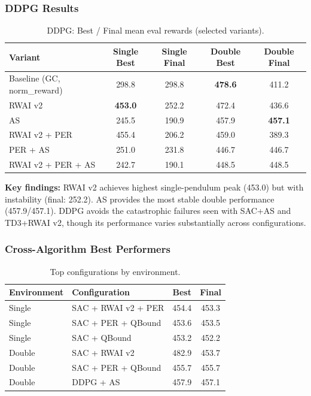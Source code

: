 \documentclass[11pt,a4paper]{article}
\begin{document}
\subsubsection{DDPG Results}

\begin{table}[h]
\centering
\caption{DDPG: Best / Final mean eval rewards (selected variants).}
\small
\begin{tabular}{lcccc}
\toprule
Variant & Single Best & Single Final & Double Best & Double Final \\
\midrule
Baseline (GC, norm\_reward) & 298.8 & 298.8 & \textbf{478.6} & 411.2 \\
RWAI v2 & \textbf{453.0} & 252.2 & 472.4 & 436.6 \\
AS & 245.5 & 190.9 & 457.9 & \textbf{457.1} \\
RWAI v2 + PER & 455.4 & 206.2 & 459.0 & 389.3 \\
PER + AS & 251.0 & 231.8 & 446.7 & 446.7 \\
RWAI v2 + PER + AS & 242.7 & 190.1 & 448.5 & 448.5 \\
\bottomrule
\end{tabular}
\label{tab:ddpg_results}
\end{table}

\textbf{Key findings:} RWAI v2 achieves highest single-pendulum peak (453.0) but with instability (final: 252.2). AS provides the most stable double performance (457.9/457.1). DDPG avoids the catastrophic failures seen with SAC+AS and TD3+RWAI v2, though its performance varies substantially across configurations.

\subsubsection{Cross-Algorithm Best Performers}

\begin{table}[h]
\centering
\caption{Top configurations by environment.}
\begin{tabular}{llcc}
\toprule
Environment & Configuration & Best & Final \\
\midrule
Single & SAC + RWAI v2 + PER & 454.4 & 453.3 \\
Single & SAC + PER + QBound & 453.6 & 453.5 \\
Single & SAC + QBound & 453.2 & 452.2 \\
Double & SAC + RWAI v2 & 482.9 & 453.7 \\
Double & SAC + PER + QBound & 455.7 & 455.7 \\
Double & DDPG + AS & 457.9 & 457.1 \\
\bottomrule
\end{tabular}
\label{tab:best}
\end{table}
\end{document}
